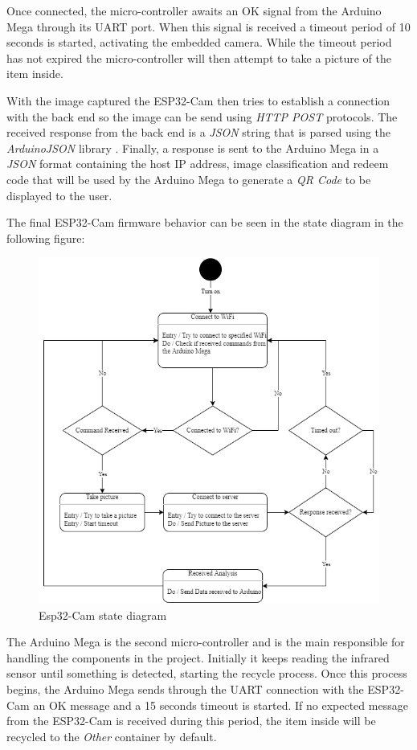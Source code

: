 \documentclass[a4paper,11pt]{article}
\begin{document}
Once connected, the micro-controller awaits an OK signal from the Arduino Mega through its UART port. When this signal is received a timeout period of 10 seconds is started, activating the embedded camera. While the timeout period has not expired the micro-controller will then attempt to take a picture of the item inside.

With the image captured the ESP32-Cam then tries to establish a connection with the back end so the image can be send using \textit{HTTP POST} protocols. The received response from the back end is a \textit{JSON} string that is parsed using the \textit{ArduinoJSON} library \cite{ArduinoJson}. Finally, a response is sent to the Arduino Mega in a \textit{JSON} format containing the host IP address, image classification and redeem code that will be used by the Arduino Mega to generate a \textit{QR Code} to be displayed to the user.

The final ESP32-Cam firmware behavior can be seen in the state diagram in the following figure:

\begin{figure}[H]
  \centering
  \includegraphics[width=12cm]{Figures/State Chart Esp32.png}
  \caption{\small{Esp32-Cam state diagram}}
  \label{fig:espState}
\end{figure}

The Arduino Mega is the second micro-controller and is the main responsible for handling the components in the project. Initially it keeps reading the infrared sensor until something is detected, starting the recycle process. Once this process begins, the Arduino Mega sends through the UART connection with the ESP32-Cam an OK message and a 15 seconds timeout is started. If no expected message from the ESP32-Cam is received during this period, the item inside will be recycled to the \textit{Other} container by default.
\end{document}

